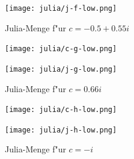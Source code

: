 \begin{refsection}
\begin{figure}
\begin{center}
\texttt{[image: julia/j-f-low.png]}
\end{center}
\caption{Julia-Menge f"ur $c= -0.5+0.55i$\label{julia:f}}
\end{figure}

\begin{figure}
\begin{center}
\texttt{[image: julia/c-g-low.png]}

\bigskip

\texttt{[image: julia/j-g-low.png]}
\end{center}
\caption{Julia-Menge f"ur $c= 0.66i$\label{julia:g}}
\end{figure}

\begin{figure}
\begin{center}
\texttt{[image: julia/c-h-low.png]}

\bigskip

\texttt{[image: julia/j-h-low.png]}
\end{center}
\caption{Julia-Menge f"ur $c= -i$\label{julia:h}}
\end{figure}

\printbibliography[heading=subbibliography]
\end{refsection}
